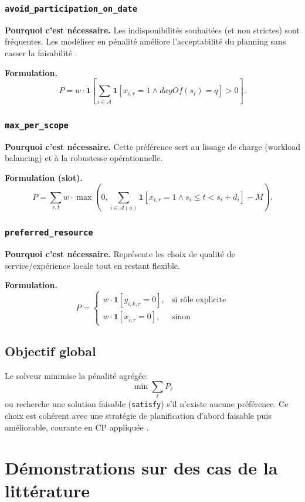 \documentclass[12pt,a4paper]{article}
\begin{document}
\subsubsection{\texttt{avoid\_participation\_on\_date}}
\textbf{Pourquoi c'est nécessaire.}
Les indisponibilités souhaitées (et non strictes) sont fréquentes. Les modéliser en pénalité améliore l'acceptabilité du planning sans casser la faisabilité \cite{torba2024msrcmpsp}.

\textbf{Formulation.}
\[
P = w\cdot \mathbf{1}\!\left[\sum_{i\in\mathcal{A}}\mathbf{1}[x_{i,r}=1\land dayOf(s_i)=q] > 0\right].
\]

\subsubsection{\texttt{max\_per\_scope}}
\textbf{Pourquoi c'est nécessaire.}
Cette préférence sert au lissage de charge (workload balancing) et à la robustesse opérationnelle.

\textbf{Formulation (slot).}
\[
P=\sum_{r,t} w\cdot \max\!\left(0,\sum_{i\in\mathcal{A}(a)}\mathbf{1}[x_{i,r}=1\land s_i\le t<s_i+d_i]-M\right).
\]

\subsubsection{\texttt{preferred\_resource}}
\textbf{Pourquoi c'est nécessaire.}
Représente les choix de qualité de service/expérience locale tout en restant flexible.

\textbf{Formulation.}
\[
P =
\begin{cases}
w\cdot \mathbf{1}[y_{i,k,r}=0], & \text{si rôle explicite}\\
w\cdot \mathbf{1}[x_{i,r}=0], & \text{sinon}
\end{cases}
\]

\subsection{Objectif global}
Le solveur minimise la pénalité agrégée:
\[
\min \sum_{\ell} P_\ell
\]
ou recherche une solution faisable (\texttt{satisfy}) s'il n'existe aucune préférence. Ce choix est cohérent avec une stratégie de planification d'abord faisable puis améliorable, courante en CP appliquée \cite{nethercote2007minizinc,constraintllm2025}.

\section{Démonstrations sur des cas de la littérature}
\end{document}
